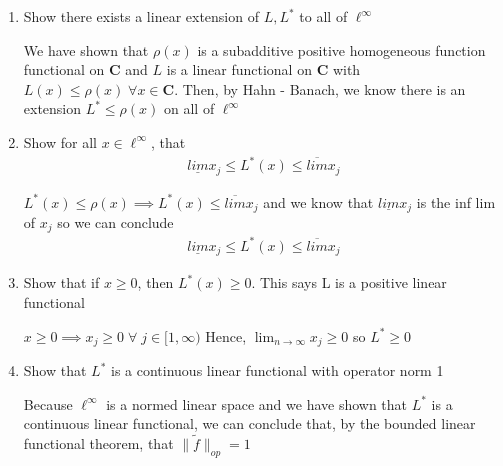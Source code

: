 \documentclass[11pt]{SelfArxOneColBMN}
\begin{document}
\begin{exercise}
\begin{enumerate}
    \item Show there exists a linear extension of $L, L^*$ to all of $\ell^\infty$
    \begin{solution}
      We have shown that $\rho(x)$ is a subadditive positive homogeneous function functional on $\mathbf{C}$ and $L$ is a linear functional on $\mathbf{C}$ with $L(x) \leq \rho(x) \; \forall x \in \mathbf{C}$. Then, by Hahn - Banach, we know there is an extension $L^* \leq \rho(x)$ on all of $\ell^\infty$
    \end{solution}
    \item Show for all $x \in \ell^\infty$, that
    \begin{eqnarray*}
      \underline{lim}x_j \leq L^*(x) \leq \overline{lim}x_j
    \end{eqnarray*}
      \begin{solution}
        $L^*(x) \leq \rho(x) \implies L^*(x) \leq \overline{lim}x_j$ and we know that $\underline{lim}x_j$ is the inf lim of $x_j$ so we can conclude
        \begin{eqnarray*}
        \underline{lim}x_j \leq L^*(x) \leq \overline{lim}x_j
      \end{eqnarray*} 
    \end{solution}
    \item Show that if $x \geq 0$, then $L^*(x) \geq 0$. This says L is a positive linear functional
    \begin{solution}
      $x \geq 0 \implies x_j \geq 0 \; \forall \; j \in [1,\infty)$ Hence, $\lim_{n\rightarrow\infty}x_j \geq 0$ so $L^* \geq 0$
    \end{solution}
    \item Show that $L^*$ is a continuous linear functional with operator norm 1
    \begin{solution}
      Because $\ell^\infty$ is a normed linear space and we have shown that $L^*$ is a continuous linear functional, we can conclude that, by the bounded linear functional theorem, that $\|\widetilde{f}\|_{op} = 1$
    \end{solution}
  \end{enumerate}
\end{exercise}
\end{document}

